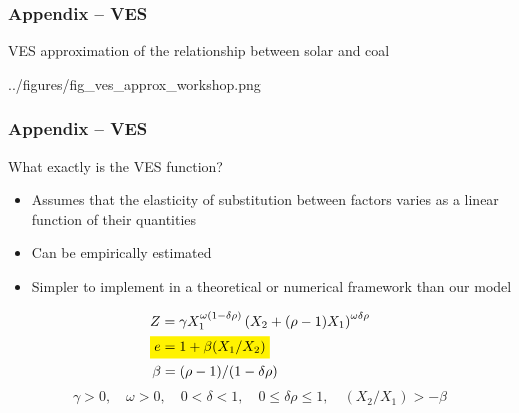 \documentclass[aspectratio=169]{beamer}
\newcommand{\highlight}[2][yellow]{\mathchoice%
	{\colorbox{#1}{$\displaystyle#2$}}%
	{\colorbox{#1}{$\textstyle#2$}}%
	{\colorbox{#1}{$\scriptstyle#2$}}%
	{\colorbox{#1}{$\scriptscriptstyle#2$}}}%
\begin{document}
	
	\begin{frame}
		\frametitle{Appendix -- VES}
		
		\begin{block}{\centering VES approximation of the relationship between solar and coal}
		\end{block}
		
		\hspace*{-1.5em}
		\begin{overpic}[width=1.1\textwidth,tics=10]{../figures/fig_ves_approx_workshop.png} 
		\end{overpic}
		
	\end{frame}
	
	
	\begin{frame}
		\frametitle{Appendix -- VES}
		
		\begin{block}{What exactly is the VES function?}
			\begin{itemize}
				\setlength\itemsep{0.5em}
				\item Assumes that the elasticity of substitution between factors varies as a linear function of their quantities
				\item Can be empirically estimated
				\item Simpler to implement in a theoretical or numerical framework than our model
			\end{itemize}
			\begin{align*}
			&Z = \gamma X_1^{\omega(1-\delta \rho)} \left( X_2 + (\rho - 1) X_1 \right)^{\omega \delta \rho} \\
			&\highlight{e = 1 + \beta (X_1 / X_2)} \\
			&\,\beta = (\rho - 1) / ( 1- \delta \rho ) 
			\end{align*}
			\vspace{-4ex}
			$$\gamma > 0, \quad \omega > 0, \quad0 < \delta < 1, \quad 0 \leq \delta \rho \leq 1 , \quad (X_2/X_1) >  -\beta $$
		\end{block}
		
	\end{frame}
	
	
	
\end{document}
